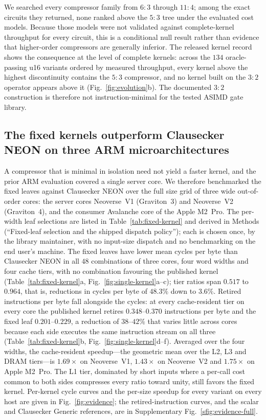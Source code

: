 \documentclass[fleqn,10pt]{wlscirep}
\begin{document}
We searched every compressor family from $6{:}3$ through $11{:}4$; among the exact circuits they returned, none ranked above the $5{:}3$ tree under the evaluated cost models. Because those models were not validated against complete-kernel throughput for every circuit, this is a conditional null result rather than evidence that higher-order compressors are generally inferior. The released kernel record shows the consequence at the level of complete kernels: across the $134$ oracle-passing u16 variants ordered by measured throughput, every kernel above the highest discontinuity contains the $5{:}3$ compressor, and no kernel built on the $3{:}2$ operator appears above it (Fig.~\ref{fig:evolution}b). The documented $3{:}2$ construction is therefore not instruction-minimal for the tested ASIMD gate library.

\subsection*{The fixed kernels outperform Clausecker NEON on three ARM microarchitectures}

A compressor that is minimal in isolation need not yield a faster kernel, and the prior ARM evaluation covered a single server core. We therefore benchmarked the fixed leaves against Clausecker NEON over the full size grid of three wide out-of-order cores: the server cores Neoverse~V1 (Graviton~3) and Neoverse~V2 (Graviton~4), and the consumer Avalanche core of the Apple M2~Pro. The per-width leaf selections are listed in Table~\ref{tab:fixed-kernel} and derived in Methods (``Fixed-leaf selection and the shipped dispatch policy''); each is chosen once, by the library maintainer, with no input-size dispatch and no benchmarking on the end user's machine. The fixed leaves have lower mean cycles per byte than Clausecker NEON in all $48$ combinations of three cores, four word widths and four cache tiers, with no combination favouring the published kernel (Table~\ref{tab:fixed-kernel}a, Fig.~\ref{fig:single-kernel}a--c); tier ratios span $0.517$ to $0.964$, that is, reductions in cycles per byte of $48.3\%$ down to $3.6\%$. Retired instructions per byte fall alongside the cycles: at every cache-resident tier on every core the published kernel retires $0.348$--$0.370$ instructions per byte and the fixed leaf $0.201$--$0.229$, a reduction of $38$--$42\%$ that varies little across cores because each side executes the same instruction stream on all three (Table~\ref{tab:fixed-kernel}b, Fig.~\ref{fig:single-kernel}d--f). Averaged over the four widths, the cache-resident speedup---the geometric mean over the L2, L3 and DRAM tiers---is $1.69\times$ on Neoverse~V1, $1.43\times$ on Neoverse~V2 and $1.75\times$ on Apple M2~Pro. The L1 tier, dominated by short inputs where a per-call cost common to both sides compresses every ratio toward unity, still favors the fixed kernel. Per-kernel cycle curves and the per-size speedup for every variant on every host are given in Fig.~\ref{fig:evidence}; the retired-instruction curves, and the scalar and Clausecker Generic references, are in Supplementary Fig.~\ref{sfig:evidence-full}.
\end{document}
